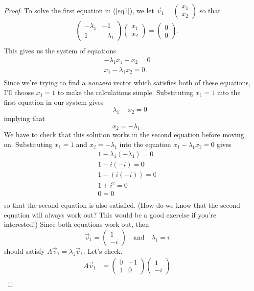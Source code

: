 \documentclass{article}
\begin{document}
\begin{proof}
To solve the first equation in (\ref{eq1}), we let $\vec{v}_1 = \begin{pmatrix}x_1\\x_2\end{pmatrix}$ so that 
\begin{align*}
\begin{pmatrix}-\lambda_1&-1\\1&-\lambda_1\end{pmatrix}\begin{pmatrix}x_1\\x_2\end{pmatrix} = \begin{pmatrix}0\\0\end{pmatrix}.\\
\end{align*}
This gives us the system of equations
\begin{align*}
-\lambda_1 x_1 - x_2 = 0\\
x_1 - \lambda_1 x_2 = 0.\\
\end{align*}
Since we're trying to find a \textit{nonzero} vector which satisfies both of these equations, I'll choose $x_1 = 1$ to make the calculations simple. Substituting $x_1 = 1$ into the first equation in our system gives $$-\lambda_1 - x_2 = 0$$ implying that $$x_2 = -\lambda_1.$$ We have to check that this solution works in the second equation before moving on. Substituting $x_1 = 1$ and $x_2 = -\lambda_1$ into the equation $x_1 - \lambda_1 x_2 = 0$ gives 
\begin{align*}
1 - \lambda_1 \left(-\lambda_1\right) = 0\\
1 - i \left(-i\right) = 0\\
1 - \left( i\left(-i\right)\right) = 0\\
1 + i^2 = 0\\
0 = 0\\
\end{align*}
so that the second equation is also satisfied. (How do we know that the second equation will always work out? This would be a good exercise if you're interested!) Since both equations work out, then $$\vec{v}_1 = \begin{pmatrix}1\\-i\end{pmatrix} \quad \text{and} \quad \lambda_1 = i$$ should satisfy $A\vec{v}_1 = \lambda_1 \vec{v}_1$. Let's check.
\begin{align*}
A \vec{v}_1 &= \begin{pmatrix}0&-1\\1&0\end{pmatrix} \begin{pmatrix}1\\-i\end{pmatrix}\\

\end{align*}
\end{proof}
\end{document}
